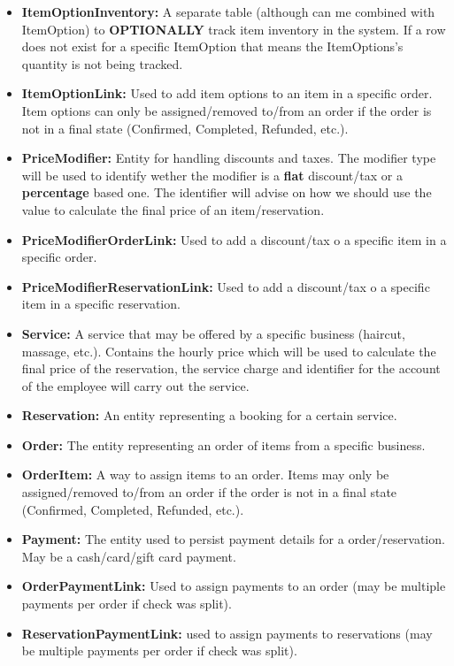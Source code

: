\documentclass[11pt,a4paper,pdftex]{article}
\begin{document}
\begin{itemize}
    \item \textbf{ItemOptionInventory:} A separate table (although can me combined with ItemOption) to \textbf{OPTIONALLY} track item inventory in the system. If a row does not exist for a specific ItemOption that means the ItemOptions's quantity is not being tracked.
    \item \textbf{ItemOptionLink:} Used to add item options to an item in a specific order. Item options can only be assigned/removed to/from an order if the order is not in a final state (Confirmed, Completed, Refunded, etc.).
    \item \textbf{PriceModifier:} Entity for handling discounts and taxes. The modifier type will be used to identify wether the modifier is a \textbf{flat} discount/tax or a \textbf{percentage} based one. The identifier will advise on how we should use the value to calculate the final price of an item/reservation.
    \item \textbf{PriceModifierOrderLink:} Used to add a discount/tax o a specific item in a specific order.
    \item \textbf{PriceModifierReservationLink:} Used to add a discount/tax o a specific item in a specific reservation.
    \item \textbf{Service:} A service that may be offered by a specific business (haircut, massage, etc.). Contains the hourly price which will be used to calculate the final price of the reservation, the service charge and identifier for the account of the employee will carry out the service.
    \item \textbf{Reservation:} An entity representing a booking for a certain service.
    \item \textbf{Order:} The entity representing an order of items from a specific business.
    \item \textbf{OrderItem:} A way to assign items to an order. Items may only be assigned/removed to/from an order if the order is not in a final state (Confirmed, Completed, Refunded, etc.).
    \item \textbf{Payment:} The entity used to persist payment details for a order/reservation. May be a cash/card/gift card payment.
    \item \textbf{OrderPaymentLink:} Used to assign payments to an order (may be multiple payments per order if check was split).
    \item \textbf{ReservationPaymentLink:} used to assign payments to reservations (may be multiple payments per order if check was split).
\end{itemize}
\end{document}
